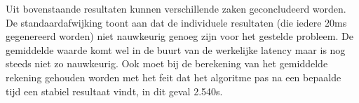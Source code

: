Uit bovenstaande resultaten kunnen verschillende zaken geconcludeerd worden. De standaardafwijking toont aan dat de individuele resultaten (die iedere 20ms gegenereerd worden) niet nauwkeurig genoeg zijn voor het gestelde probleem. De gemiddelde waarde komt wel in de buurt van de werkelijke latency maar is nog steeds niet zo nauwkeurig. Ook moet bij de berekening van het gemiddelde rekening gehouden worden met het feit dat het algoritme pas na een bepaalde tijd een stabiel resultaat vindt, in dit geval 2.540s.
